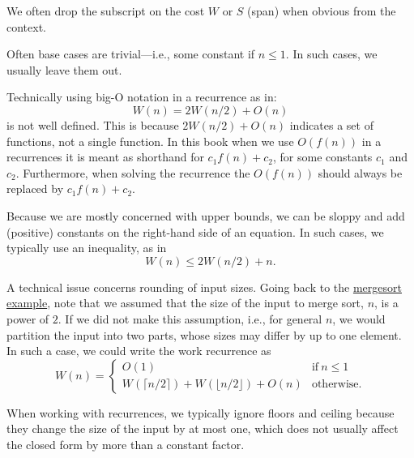 \begin{gram}
We often drop the subscript on the cost $W$ or $S$ (span) when obvious from the context.
\end{gram}
%

\begin{gram}
Often  base cases are trivial---i.e., some constant if $n
\leq 1$.  In such cases, we usually leave them out.
\end{gram}
%

\begin{gram}
Technically using big-O notation in a recurrence as in:
\[ 
W(n) = 2 W(n/2) + O(n) 
\]
%
is not well defined.   
%
This is because $2 W(n/2) + O(n)$ indicates a
set of functions, not a single function.    
%
In this book when we use
$O(f(n))$ in a recurrences it is meant as shorthand for $c_1 f(n) +
c_2$, for some constants $c_1$ and $c_2$. 
% 
Furthermore, when solving the recurrence the $O(f(n))$ should
always be replaced by $c_1 f(n) + c_2$.
\end{gram}
%

\begin{gram}[Inequality]
Because we are mostly concerned with upper bounds,  we can be  sloppy and 
add (positive) constants on the right-hand side of an equation.
%
In such cases, we typically use an inequality, as in
\[ 
W(n) \leq 2 W(n/2) + n.
\]
\end{gram}


\begin{gram}
A technical issue concerns rounding of input sizes.
%
Going back to the \href{ex:analysis::recurrences::mergesort}{mergesort example}, note that we assumed that the size
of the input to merge sort, $n$, is a power of $2$.
%
If we did not make this assumption, i.e., for general $n$, 
we would partition the input into two parts, whose sizes may differ by up to one element.
%
In such a case, we could write the work recurrence as 
\[
W(n) = \left\{
\begin{array}{ll}
O(1) & \mbox{if} ~ n \le 1
\\
W(\lceil n/2 \rceil) + W(\lfloor n/2 \rfloor) + O(n) &  \mbox{otherwise}.
\end{array}
\right.
\]
%

When working with recurrences, we typically ignore floors and ceiling
because they change the size of the input by at most one, which
does not usually affect the closed form by more than a constant
factor.
\end{gram}


